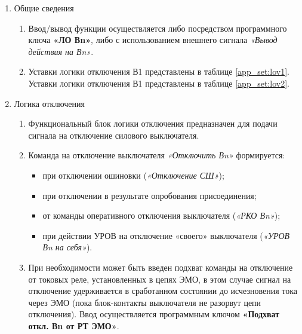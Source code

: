 \color{black}

\begin{enumerate}

\item{Общие сведения}

\begin{enumerate}

\item
Ввод/вывод функции осуществляется либо посредством программного ключа \textbf{«ЛО Вn»}, либо с использованием внешнего сигнала \textit{«Вывод действия на Вn»}.

\item
Уставки логики отключения В1 представлены в таблице \ref{app_set:lov1}. Уставки логики отключения В1 представлены в таблице \ref{app_set:lov2}.

\end{enumerate}


\item{Логика отключения}

\begin{enumerate}

\item
Функциональный блок логики отключения предназначен для подачи сигнала на отключение силового выключателя.

\item
Команда на отключение выключателя \textit{«Отключить Вn»} формируется:
\begin{itemize}
\item при отключении ошиновки (\textit{«Отключение СШ»});
\item при отключении в результате опробования присоединения;
\item от команды оперативного отключения выключателя (\textit{«РКО Вn»});
\item при действии УРОВ на отключение «своего» выключателя (\textit{«УРОВ Вn на себя»}).
\end{itemize}

\item
При необходимости может быть введен подхват команды на отключение от токовых реле, установленных в цепях ЭМО, в этом случае сигнал на отключение удерживается в сработанном состоянии до
исчезновения тока через ЭМО (пока блок-контакты выключателя не разорвут цепи отключения). Ввод осуществляется программным ключом \textbf{«Подхват откл. Вn от РТ ЭМО»}. 


\end{enumerate}
\end{enumerate}
